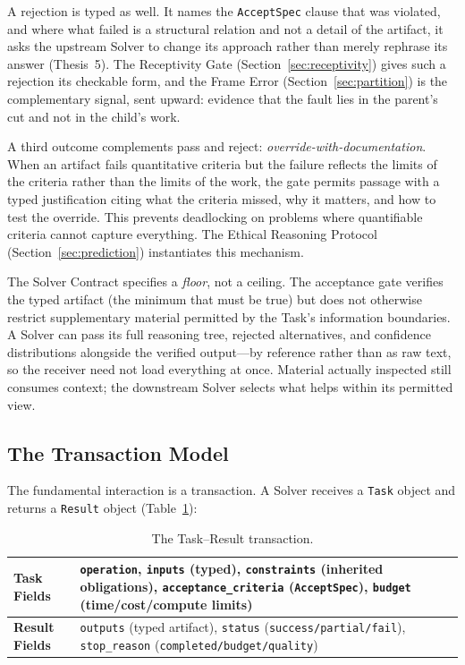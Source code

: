 \documentclass[11pt]{article}
\let\oldtexttt\texttt
\renewcommand{\texttt}[1]{\oldtexttt{\small #1}}
\begin{document}
A rejection is typed as well. It names the \texttt{AcceptSpec} clause that was violated, and where what failed is a structural relation and not a detail of the artifact, it asks the upstream Solver to change its approach rather than merely rephrase its answer (Thesis~5). The Receptivity Gate (Section~\ref{sec:receptivity}) gives such a rejection its checkable form, and the Frame Error (Section~\ref{sec:partition}) is the complementary signal, sent upward: evidence that the fault lies in the parent's cut and not in the child's work.

A third outcome complements pass and reject: \emph{override-with-documentation}. When an artifact fails quantitative criteria but the failure reflects the limits of the criteria rather than the limits of the work, the gate permits passage with a typed justification citing what the criteria missed, why it matters, and how to test the override. This prevents deadlocking on problems where quantifiable criteria cannot capture everything. The Ethical Reasoning Protocol (Section~\ref{sec:prediction}) instantiates this mechanism.

The Solver Contract specifies a \emph{floor}, not a ceiling. The acceptance gate verifies the typed artifact (the minimum that must be true) but does not otherwise restrict supplementary material permitted by the Task's information boundaries. A Solver can pass its full reasoning tree, rejected alternatives, and confidence distributions alongside the verified output---by reference rather than as raw text, so the receiver need not load everything at once. Material actually inspected still consumes context; the downstream Solver selects what helps within its permitted view.

\subsection{The Transaction Model}

The fundamental interaction is a transaction. A Solver receives a \texttt{Task} object and returns a \texttt{Result} object (Table~\ref{tab:transaction}):

\begin{table}[h]
\centering
\caption{The Task--Result transaction.}
\label{tab:transaction}
\small
\begin{tabular}{@{}lp{8cm}@{}}
\toprule
\textbf{Task Fields} & \texttt{operation}, \texttt{inputs} (typed), \texttt{constraints} (inherited obligations), \texttt{acceptance\_criteria} (\texttt{AcceptSpec}), \texttt{budget} (time/cost/compute limits) \\
\midrule
\textbf{Result Fields} & \texttt{outputs} (typed artifact), \texttt{status} (\texttt{success/partial/fail}), \texttt{stop\_reason} (\texttt{completed/budget/quality}) \\
\bottomrule
\end{tabular}
\end{table}
\end{document}
